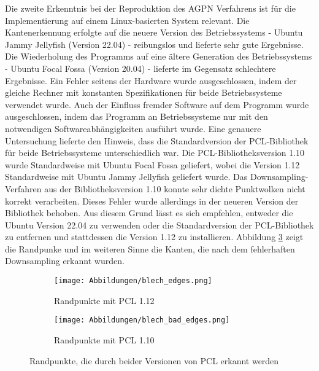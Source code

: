 Die zweite Erkenntnis bei der Reproduktion des AGPN Verfahrens ist für die Implementierung auf einem Linux-basierten System relevant. Die Kantenerkennung erfolgte auf die neuere Version des Betriebssystems - Ubuntu Jammy Jellyfish (Version 22.04) - reibungslos und lieferte sehr gute Ergebnisse. Die Wiederholung des Programms auf eine ältere Generation des Betriebssystems - Ubuntu Focal Fossa (Version 20.04) - lieferte im Gegensatz schlechtere Ergebnisse. Ein Fehler seitens der Hardware wurde ausgeschlossen, indem der gleiche Rechner mit konstanten Spezifikationen für beide Betriebssysteme verwendet wurde. Auch der Einfluss fremder Software auf dem Programm wurde ausgeschlossen, indem das Programm an Betriebssysteme nur mit den notwendigen Softwareabhängigkeiten ausführt wurde. Eine genauere Untersuchung lieferte den Hinweis, dass die Standardversion der PCL-Bibliothek für beide Betriebssysteme unterschiedlich war. Die PCL-Bibliotheksversion 1.10 wurde Standardweise mit Ubuntu Focal Fossa geliefert, wobei die Version 1.12 Standardweise mit Ubuntu Jammy Jellyfish geliefert wurde. Das Downsampling-Verfahren aus der Bibliotheksversion 1.10 konnte sehr dichte Punktwolken nicht korrekt verarbeiten. Dieses Fehler wurde allerdings in der neueren Version der Bibliothek behoben. Aus diesem Grund lässt es sich empfehlen, entweder die Ubuntu Version 22.04 zu verwenden oder die Standardversion der PCL-Bibliothek zu entfernen und stattdessen die Version 1.12 zu installieren. Abbildung \ref{fig: pcl_version_comparision} zeigt die Randpunke und im weiteren Sinne die Kanten, die nach dem fehlerhaften Downsampling erkannt wurden.


\begin{figure}[t]
	\centering
	\begin{subfigure}[h]{0.49\textwidth}
		\texttt{[image: Abbildungen/blech\_edges.png]}
		\centering
		\caption{Randpunkte mit PCL 1.12}
		\label{fig: blech_edges}
	\end{subfigure}
	\hfill
	\begin{subfigure}[h]{0.49\textwidth}
		\texttt{[image: Abbildungen/blech\_bad\_edges.png]}
		\centering
		\caption{Randpunkte mit PCL 1.10}
		\label{fig: bad_edges}
	\end{subfigure}
	\caption{Randpunkte, die durch beider Versionen von PCL erkannt werden}
	\label{fig: pcl_version_comparision}
\end{figure}

